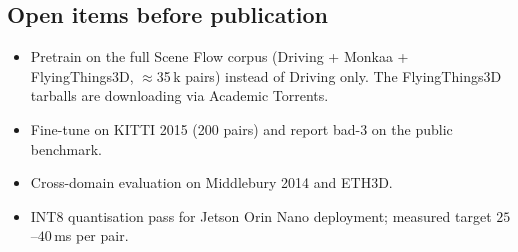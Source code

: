 \documentclass[11pt,a4paper]{article}
\begin{document}
\subsection{Open items before publication}

\begin{itemize}[leftmargin=*, topsep=1pt, itemsep=1pt]
  \item Pretrain on the full Scene Flow corpus (Driving + Monkaa +
    FlyingThings3D, $\approx$35\,k pairs) instead of Driving only. The
    FlyingThings3D tarballs are downloading via Academic Torrents.
  \item Fine-tune on KITTI 2015 (200 pairs) and report bad-3 on the
    public benchmark.
  \item Cross-domain evaluation on Middlebury 2014 and ETH3D.
  \item INT8 quantisation pass for Jetson Orin Nano deployment;
    measured target $25$--$40$\,ms per pair.
\end{itemize}
\end{document}
